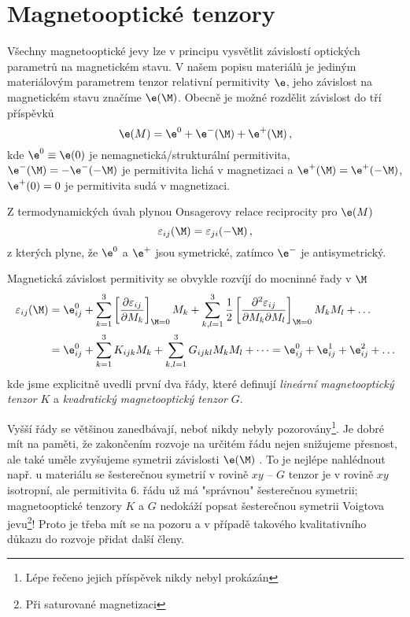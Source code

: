 \section{Magnetooptické tenzory \cite{Visbible}}

Všechny magnetooptické jevy lze v principu vysvětlit závislostí optických parametrů na magnetickém stavu\cite{Silber}.
V našem popisu materiálů je jediným materiálovým parametrem tenzor relativní permitivity $\e$, jeho závislost na magnetickém stavu značíme $\e(\M)$.
Obecně je možné rozdělit závislost do tří příspěvků
\begin{equation}
\e(M)=\e^0 + \e^{-}(\M) + \e^{+}(\M) \,,
\end{equation}
kde $\e^0\equiv \e(0)$ je nemagnetická/strukturální permitivita, $\e^-(\M)=-\e^-(-\M)$ je permitivita lichá v magnetizaci a $\e^+(\M)=\e^+(-\M)$, $\e^+(0)=0$ je permitivita sudá v magnetizaci.

Z termodynamických úvah plynou Onsagerovy relace reciprocity\cite{Onsager} pro $\e(M)$
\begin{equation}
\varepsilon_{ij}(\M)=\varepsilon_{ji}(-\M) \,,
\end{equation}
z kterých plyne, že $\e^0$ a $\e^+$ jsou symetrické, zatímco $\e^-$ je antisymetrický.

Magnetická závislost permitivity se obvykle rozvíjí do mocninné řady v $\M$
\begin{align} \label{e:MO tenzory}
\varepsilon_{ij}(\M)&=\e^0_{ij} + \sum_{k=1}^{3}\left[ \frac{\partial \varepsilon_{ij}}{\partial M_k}\right]_{\M=0} M_k + \sum_{k,l=1}^{3} \frac{1}{2}\left[ \frac{\partial^2 \varepsilon_{ij}}{\partial M_k \partial M_l}\right]_{\M=0} M_k M_l + \dots \\
&=\e^0_{ij} + \sum_{k=1}^{3}K_{ijk} M_k + \sum_{k,l=1}^{3} G_{ijkl} M_k M_l + \dots=\e^0_{ij} +\e^1_{ij} +\e^2_{ij} + \dots
\end{align}
kde jsme explicitně uvedli první dva řády, které definují \emph{lineární magnetooptický tenzor} $K$ a \emph{kvadratický magnetooptický tenzor} $G$. \cite{Visbible}

Vyšší řády se většinou zanedbávají, neboť nikdy nebyly pozorovány\footnote{Lépe řečeno jejich příspěvek nikdy nebyl prokázán}.
Je dobré mít na paměti, že zakončením rozvoje na určitém řádu nejen snižujeme přesnost, ale také uměle zvyšujeme symetrii závislosti $\e(\M)$ \cite{Silber}.
To je nejlépe nahlédnout např. u materiálu se šesterečnou symetrií v rovině $xy$ -- $G$ tenzor je v rovině $xy$ isotropní, ale permitivita 6. řádu už má "správnou" šesterečnou symetrii; magnetooptické tenzory $K$ a $G$ nedokáží popsat šesterečnou symetrii Voigtova jevu\footnote{Při saturované magnetizaci}!
Proto je třeba mít se na pozoru a v případě takového kvalitativního důkazu do rozvoje přidat další členy.

